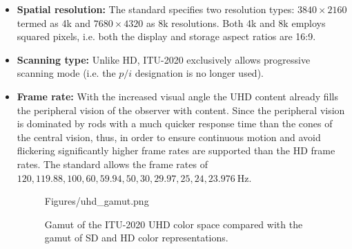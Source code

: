 \begin{itemize}
\item \textbf{Spatial resolution:} 
The standard specifies two resolution types: $3840 \times 2160$ termed as 4k and $7680 \times 4320$ as 8k resolutions.
Both 4k and 8k employs squared pixels, i.e. both the display and storage aspect ratios are 16:9.
%
\item \textbf{Scanning type:}
Unlike HD, ITU-2020 exclusively allows progressive scanning mode (i.e. the $p/i$ designation is no longer used).

\item \textbf{Frame rate:}
With the increased visual angle the UHD content already fills the peripheral vision of the observer with content.
Since the peripheral vision is dominated by rods with a much quicker response time than the cones of the central vision, thus, in order to ensure continuous motion and avoid flickering significantly higher frame rates are supported than the HD frame rates.
The standard allows the frame rates of $120, 119.88, 100, 60, 59.94, 50, 30, 29.97, 25, 24, 23.976~\mathrm{Hz}$.
\begin{figure}[]
	\centering
	\begin{overpic}[width = 0.75 \columnwidth ]{Figures/uhd_gamut.png}
	\small
	\end{overpic}
	\caption{Gamut of the ITU-2020 UHD color space compared with the gamut of SD and HD color representations.}
	\label{Fig:UHD_gamut}
\end{figure}


\end{itemize}

